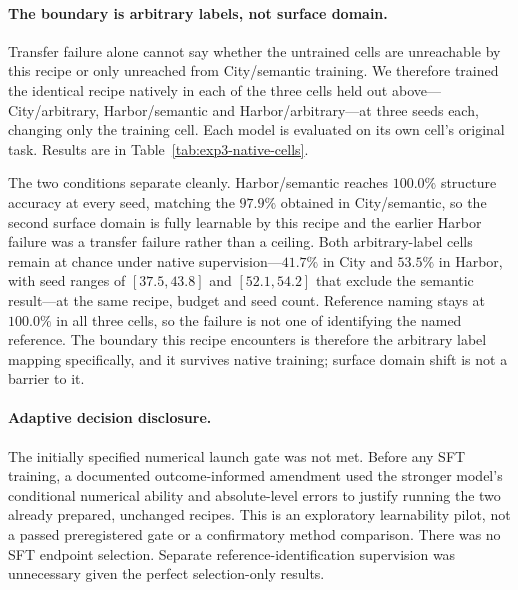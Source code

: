 \paragraph{The boundary is arbitrary labels, not surface domain.}
Transfer failure alone cannot say whether the untrained cells are unreachable
by this recipe or only unreached from City/semantic training. We therefore
trained the identical recipe natively in each of the three cells held out
above---City/arbitrary, Harbor/semantic and Harbor/arbitrary---at three seeds
each, changing only the training cell. Each model is evaluated on its own
cell's original task. Results are in
Table~\ref{tab:exp3-native-cells}.

The two conditions separate cleanly. Harbor/semantic reaches $100.0\%$
structure accuracy at every seed, matching the $97.9\%$ obtained in
City/semantic, so the second surface domain is fully learnable by this recipe
and the earlier Harbor failure was a transfer failure rather than a ceiling.
Both arbitrary-label cells remain at chance under native supervision---$41.7\%$
in City and $53.5\%$ in Harbor, with seed ranges of $[37.5,43.8]$ and
$[52.1,54.2]$ that exclude the semantic result---at the same recipe, budget
and seed count. Reference naming stays at $100.0\%$ in all three cells, so the
failure is not one of identifying the named reference. The boundary this
recipe encounters is therefore the arbitrary label mapping specifically, and
it survives native training; surface domain shift is not a barrier to it.

\begin{table}[htbp]
\centering\small
\setlength{\tabcolsep}{4pt}

\caption{\textbf{Native training separates the label condition from the
surface domain.} The higher-rate SFT recipe trained in each cell and evaluated
on that cell's original task, averaged over seeds 42--44. Seed range is the
minimum and maximum structure accuracy across those seeds. Name is
selection-only reference identification. Harbor is learnable under semantic
labels; neither arbitrary-label cell exceeds chance.}
\label{tab:exp3-native-cells}
\end{table}

\paragraph{Adaptive decision disclosure.}
The initially specified numerical launch gate was not met. Before any SFT
training, a documented outcome-informed amendment used the stronger model's
conditional numerical ability and absolute-level errors to justify running the
two already prepared, unchanged recipes. This is an exploratory learnability
pilot, not a passed preregistered gate or a confirmatory method comparison.
There was no SFT endpoint selection. Separate reference-identification
supervision was unnecessary given the perfect selection-only results.

